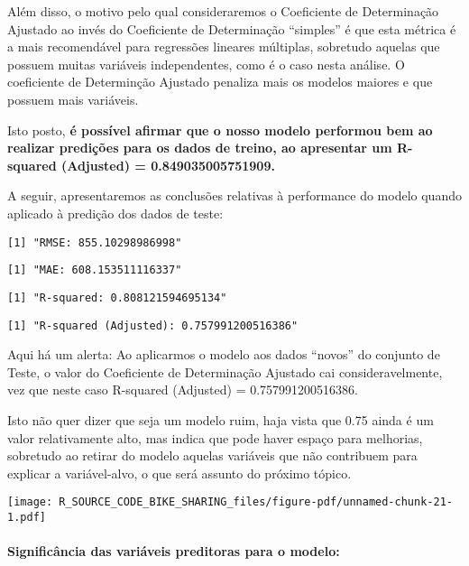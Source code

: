 \documentclass[
  letterpaper,
  DIV=11,
  numbers=noendperiod]{scrartcl}
\let\oldparagraph\paragraph
\renewcommand{\paragraph}[1]{\oldparagraph{#1}\mbox{}}
\begin{document}
Além disso, o motivo pelo qual consideraremos o Coeficiente de
Determinação Ajustado ao invés do Coeficiente de Determinação
``simples'' é que esta métrica é a mais recomendável para regressões
lineares múltiplas, sobretudo aquelas que possuem muitas variáveis
independentes, como é o caso nesta análise. O coeficiente de Determinção
Ajustado penaliza mais os modelos maiores e que possuem mais variáveis.

Isto posto, \textbf{é possível afirmar que o nosso modelo performou bem
ao realizar predições para os dados de treino, ao apresentar um
R-squared (Adjusted) = 0.849035005751909.}

A seguir, apresentaremos as conclusões relativas à performance do modelo
quando aplicado à predição dos dados de teste:

\begin{verbatim}
[1] "RMSE: 855.10298986998"
\end{verbatim}

\begin{verbatim}
[1] "MAE: 608.153511116337"
\end{verbatim}

\begin{verbatim}
[1] "R-squared: 0.808121594695134"
\end{verbatim}

\begin{verbatim}
[1] "R-squared (Adjusted): 0.757991200516386"
\end{verbatim}

Aqui há um alerta: Ao aplicarmos o modelo aos dados ``novos'' do
conjunto de Teste, o valor do Coeficiente de Determinação Ajustado cai
consideravelmente, vez que neste caso R-squared (Adjusted) =
0.757991200516386.

Isto não quer dizer que seja um modelo ruim, haja vista que 0.75 ainda é
um valor relativamente alto, mas indica que pode haver espaço para
melhorias, sobretudo ao retirar do modelo aquelas variáveis que não
contribuem para explicar a variável-alvo, o que será assunto do próximo
tópico.

\begin{center}
\texttt{[image: R\_SOURCE\_CODE\_BIKE\_SHARING\_files/figure-pdf/unnamed-chunk-21-1.pdf]}
\end{center}

\paragraph{Significância das variáveis preditoras para o
modelo:}\label{significuxe2ncia-das-variuxe1veis-preditoras-para-o-modelo}
\end{document}
